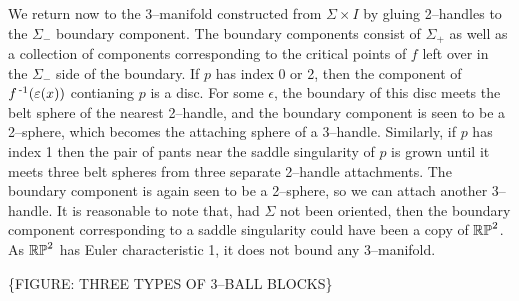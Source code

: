 We return now to the 3--manifold constructed from $\Sigma\times I$ by gluing 2--handles to the $\Sigma_-$ boundary component.
The boundary components consist of $\Sigma_+$ as well as a collection of components corresponding to the critical points of $f$ left over in the $\Sigma_-$ side of the boundary.
If $p$ has index 0 or 2, then the component of $f^{\,\text{-}1}(\varepsilon(x))$ contianing $p$ is a disc.
For some $\epsilon$, the boundary of this disc meets the belt sphere of the nearest 2--handle, and the boundary component is seen to be a 2--sphere, which becomes the attaching sphere of a 3--handle.
Similarly, if $p$ has index 1 then the pair of pants near the saddle singularity of $p$ is grown until it meets three belt spheres from three separate 2--handle attachments.
The boundary component is again seen to be a 2--sphere, so we can attach another 3--handle.
It is reasonable to note that, had $\Sigma$ not been oriented, then the boundary component corresponding to a saddle singularity could have been a copy of $\mathbb{RP}^2$.
As $\mathbb{RP}^2$ has Euler characteristic 1, it does not bound any 3--manifold.

\{FIGURE: THREE TYPES OF 3--BALL BLOCKS\}
